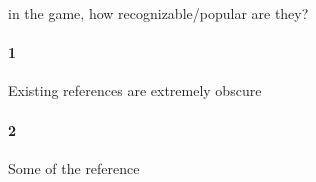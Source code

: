  in the game, how recognizable/popular are they?\paragraph{1}Existing references are extremely obscure\paragraph{2}Some of the reference